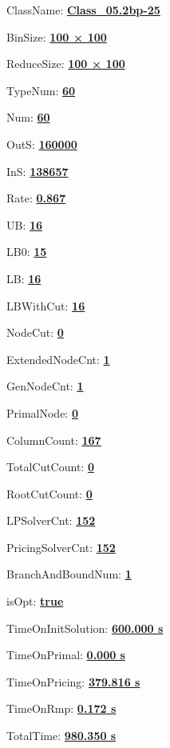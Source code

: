 \documentclass[11pt]{article}
\begin{document}
\pagestyle{empty}


ClassName: \underline{\textbf{Class_05.2bp-25}}
\par
BinSize: \underline{\textbf{100 × 100}}
\par
ReduceSize: \underline{\textbf{100 × 100}}
\par
TypeNum: \underline{\textbf{60}}
\par
Num: \underline{\textbf{60}}
\par
OutS: \underline{\textbf{160000}}
\par
InS: \underline{\textbf{138657}}
\par
Rate: \underline{\textbf{0.867}}
\par
UB: \underline{\textbf{16}}
\par
LB0: \underline{\textbf{15}}
\par
LB: \underline{\textbf{16}}
\par
LBWithCut: \underline{\textbf{16}}
\par
NodeCut: \underline{\textbf{0}}
\par
ExtendedNodeCnt: \underline{\textbf{1}}
\par
GenNodeCnt: \underline{\textbf{1}}
\par
PrimalNode: \underline{\textbf{0}}
\par
ColumnCount: \underline{\textbf{167}}
\par
TotalCutCount: \underline{\textbf{0}}
\par
RootCutCount: \underline{\textbf{0}}
\par
LPSolverCnt: \underline{\textbf{152}}
\par
PricingSolverCnt: \underline{\textbf{152}}
\par
BranchAndBoundNum: \underline{\textbf{1}}
\par
isOpt: \underline{\textbf{true}}
\par
TimeOnInitSolution: \underline{\textbf{600.000 s}}
\par
TimeOnPrimal: \underline{\textbf{0.000 s}}
\par
TimeOnPricing: \underline{\textbf{379.816 s}}
\par
TimeOnRmp: \underline{\textbf{0.172 s}}
\par
TotalTime: \underline{\textbf{980.350 s}}
\par
\newpage


\end{document}
